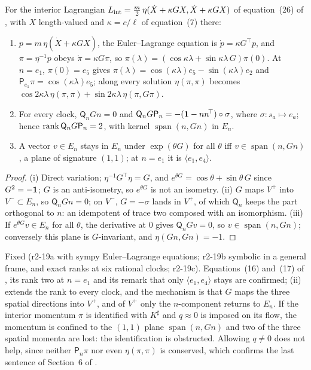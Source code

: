 \begin{proposition}
\label{r2:prop:leak}
For the interior Lagrangian $L_{\rm int}=\tfrac m2\,\eta(\dot X+\kappa GX,\dot X+\kappa GX)$ of equation~(26) of \cite{ES17}, with $X$ length-valued and $\kappa=c/\ell$
of equation~(7) there:
\begin{enumerate}[label=(\roman*),leftmargin=2.2em]
\item $p=m\,\eta(\dot X+\kappa GX)$, the Euler--Lagrange equation is $\dot p=\kappa G^{\!\top}p$, and $\pi=\eta^{-1}p$ obeys $\dot\pi=\kappa G\pi$, so
$\pi(\lambda)=(\cos\kappa\lambda+\sin\kappa\lambda\,G)\pi(0)$. At $n=e_1$, $\pi(0)=e_5$ gives $\pi(\lambda)=\cos(\kappa\lambda)e_5-\sin(\kappa\lambda)e_2$ and
$\mathsf P_{e_1}\pi=\cos(\kappa\lambda)e_5$; along every solution $\eta(\pi,\pi)$ becomes $\cos2\kappa\lambda\,\eta(\pi,\pi)+\sin2\kappa\lambda\,\eta(\pi,G\pi)$.
\item For every clock, $\mathsf Q_nGn=0$ and $\mathsf Q_nG\mathsf P_n=-(\mathbf 1-nn^{\!\top})\circ\sigma$, where $\sigma:s_a\mapsto e_a$; hence
$\operatorname{rank}\mathsf Q_nG\mathsf P_n=2$, with kernel $\operatorname{span}(n,Gn)$ in $E_n$.
\item A vector $v\in E_n$ stays in $E_n$ under $\exp(\theta G)$ for all $\theta$ iff $v\in\operatorname{span}(n,Gn)$, a plane of signature $(1,1)$; at $n=e_1$
it is $\langle e_1,e_4\rangle$.
\end{enumerate}
\end{proposition}

\begin{proof}
(i) Direct variation; $\eta^{-1}G^{\!\top}\eta=G$, and $e^{\theta G}=\cos\theta+\sin\theta\,G$ since $G^2=-\mathbf 1$; $G$ is an anti-isometry, so $e^{\theta G}$ is not an
isometry. (ii) $G$ maps $V^+$ into $V^-\subset E_n$, so $\mathsf Q_nGn=0$; on $V^-$, $G=-\sigma$ lands in $V^+$, of which $\mathsf Q_n$ keeps the part orthogonal to
$n$: an idempotent of trace two composed with an isomorphism. (iii) If $e^{\theta G}v\in E_n$ for all $\theta$, the derivative at $0$ gives $\mathsf Q_nGv=0$, so
$v\in\operatorname{span}(n,Gn)$; conversely this plane is $G$-invariant, and $\eta(Gn,Gn)=-1$.
\end{proof}

Fixed (r2-19a with sympy Euler--Lagrange equations; r2-19b symbolic in a general frame, and exact ranks at six rational clocks; r2-19c). Equations~(16)
and~(17) of \cite{FMB}, its rank two at $n=e_1$ and its remark that only $\langle e_1,e_4\rangle$ stays are confirmed; (ii) extends the rank to every clock, and the
mechanism is that $G$ maps the three spatial directions into $V^+$, and of $V^+$ only the $n$-component returns to $E_n$. If the interior
momentum $\pi$ is identified with $K^\sharp$ and $q\approx0$ is imposed on its flow, the momentum is confined to the $(1,1)$ plane $\operatorname{span}(n,Gn)$ and
two of the three spatial momenta are lost: the identification is obstructed. Allowing $q\neq0$ does not help, since neither $\mathsf P_n\pi$ nor even
$\eta(\pi,\pi)$ is conserved, which confirms the last sentence of Section~6 of \cite{FMB}.

